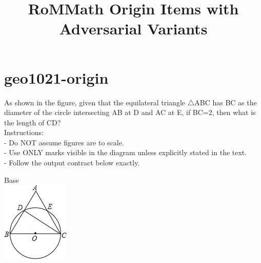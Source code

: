 \documentclass[12pt]{article}
\begin{document}
\title{RoMMath Origin Items with Adversarial Variants}
\author{}
\date{}
\maketitle
\section*{geo1021-origin}
\noindent\begin{minipage}{\textwidth}
\setlength{\parskip}{4pt}
As shown in the figure, given that the equilateral triangle \ensuremath{\triangle }ABC has BC as the diameter of the circle intersecting AB at D and AC at E, if BC=2, then what is the length of CD?\\
Instructions:\\
- Do NOT assume figures are to scale.\\
- Use ONLY marks visible in the diagram unless explicitly stated in the text.\\
- Follow the output contract below exactly.\\
\end{minipage}
\begin{center}
\begin{minipage}{0.32\textwidth}\centering
Base\\
\includegraphics[width=0.95\linewidth]{out_rommath_origin/items/geo1021-origin/assets/figure.png}
\end{minipage}
\par
\end{center}
\bigskip
\end{document}
